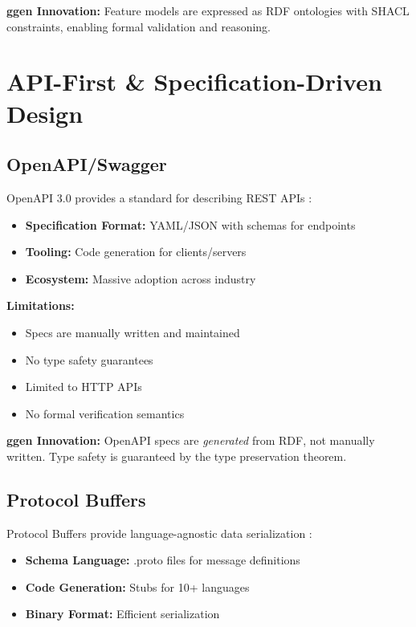 \textbf{ggen Innovation:} Feature models are expressed as RDF ontologies with SHACL constraints, enabling formal validation and reasoning.

\section{API-First \& Specification-Driven Design}

\subsection{OpenAPI/Swagger}

OpenAPI 3.0 provides a standard for describing REST APIs \cite{openapi2020}:

\begin{itemize}
    \item \textbf{Specification Format:} YAML/JSON with schemas for endpoints
    \item \textbf{Tooling:} Code generation for clients/servers
    \item \textbf{Ecosystem:} Massive adoption across industry
\end{itemize}

\textbf{Limitations:}
\begin{itemize}
    \item Specs are manually written and maintained
    \item No type safety guarantees
    \item Limited to HTTP APIs
    \item No formal verification semantics
\end{itemize}

\textbf{ggen Innovation:} OpenAPI specs are \textit{generated} from RDF, not manually written. Type safety is guaranteed by the type preservation theorem.

\subsection{Protocol Buffers}

Protocol Buffers provide language-agnostic data serialization \cite{protobuf}:

\begin{itemize}
    \item \textbf{Schema Language:} .proto files for message definitions
    \item \textbf{Code Generation:} Stubs for 10+ languages
    \item \textbf{Binary Format:} Efficient serialization
\end{itemize}

